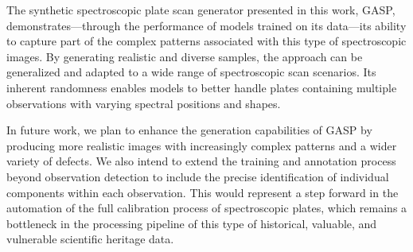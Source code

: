 \documentclass[runningheads]{llncs}
\begin{document}
The synthetic spectroscopic plate scan generator presented in this work, GASP, demonstrates—through the performance of models trained on its data—its ability to capture part of the complex patterns associated with this type of spectroscopic images. By generating realistic and diverse samples, the approach can be generalized and adapted to a wide range of spectroscopic scan scenarios. Its inherent randomness enables models to better handle plates containing multiple observations with varying spectral positions and shapes.

In future work, we plan to enhance the generation capabilities of GASP by producing more realistic images with increasingly complex patterns and a wider variety of defects. We also intend to extend the training and annotation process beyond observation detection to include the precise identification of individual components within each observation. This would represent a step forward in the automation of the full calibration process of spectroscopic plates, which remains a bottleneck in the processing pipeline of this type of historical, valuable, and vulnerable scientific heritage data.

%
%
%


%
\end{document}
